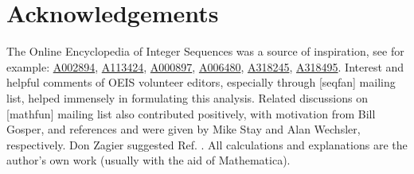 \documentclass[nofootinbib,preprint]{revtex4-1}
\begin{document}
\section*{Acknowledgements}
The Online Encyclopedia of Integer Sequences was a source of inspiration, see for example: 
\href{https://oeis.org/A002894}{A002894}, \href{https://oeis.org/A113424}{A113424}, 
\href{https://oeis.org/A000897}{A000897}, \href{https://oeis.org/A006480}{A006480}, 
\href{https://oeis.org/A318245}{A318245}, \href{https://oeis.org/A318495}{A318495}. 
Interest and helpful comments of OEIS volunteer editors, especially through [seqfan] 
mailing list, helped immensely in formulating this analysis. Related discussions on 
[mathfun] mailing list also contributed positively, with motivation from Bill Gosper, and 
references \cite{FRANTZ2006} and \cite{MEEUS1991} were given by Mike Stay and 
Alan Wechsler, respectively. Don Zagier suggested Ref. \cite{ZAGIER2009}. All calculations 
and explanations are the author's own work (usually with the aid of Mathematica). 




\pagebreak
\end{document}
